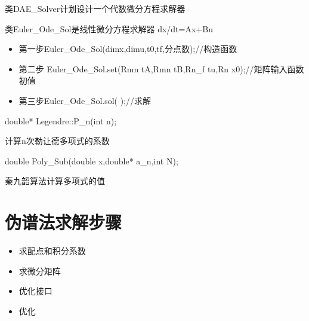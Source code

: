 \documentclass[a4]{ctexart}
\begin{document}
类DAE\_Solver计划设计一个代数微分方程求解器

类Euler\_Ode\_Sol是线性微分方程求解器
dx/dt=Ax+Bu

\begin{itemize}
\item 第一步Euler\_Ode\_Sol(dimx,dimu,t0,tf,分点数);//构造函数
\item 第二步 Euler\_Ode\_Sol.set(Rmn tA,Rmn tB,Rn\_f tu,Rn x0);//矩阵输入函数初值
\item 第三步Euler\_Ode\_Sol.sol( );//求解
\end{itemize}




double*  Legendre::P\_n(int n);

计算n次勒让德多项式的系数

double Poly\_Sub(double x,double* a\_n,int N);

秦九韶算法计算多项式的值




\section{伪谱法求解步骤}

\begin{itemize}
\item 求配点和积分系数
\item 求微分矩阵
\item 优化接口
\item 优化
\end{itemize}
\end{document}
